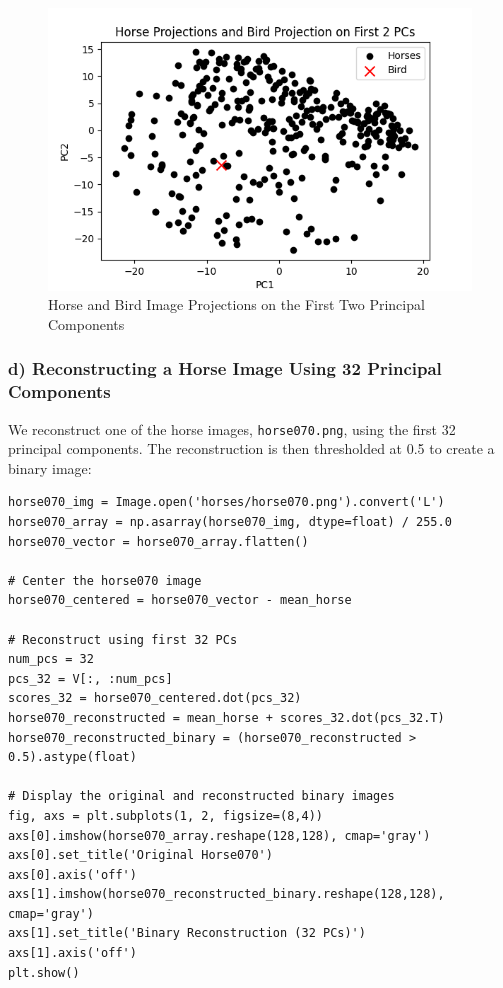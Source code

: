 \documentclass{article}
\begin{document}
\begin{figure}[h]
    \centering
    \includegraphics[width=.6\textwidth]{horse_bird_projection.png}
    \caption{Horse and Bird Image Projections on the First Two Principal Components}
    \label{fig:horse_bird_projection}
\end{figure}
\newpage
\subsubsection*{d) Reconstructing a Horse Image Using 32 Principal Components}

We reconstruct one of the horse images, \texttt{horse070.png}, using the first 32 principal components. The reconstruction is then thresholded at 0.5 to create a binary image:

\begin{verbatim}
horse070_img = Image.open('horses/horse070.png').convert('L')
horse070_array = np.asarray(horse070_img, dtype=float) / 255.0
horse070_vector = horse070_array.flatten()

# Center the horse070 image
horse070_centered = horse070_vector - mean_horse

# Reconstruct using first 32 PCs
num_pcs = 32
pcs_32 = V[:, :num_pcs]
scores_32 = horse070_centered.dot(pcs_32)
horse070_reconstructed = mean_horse + scores_32.dot(pcs_32.T)
horse070_reconstructed_binary = (horse070_reconstructed > 0.5).astype(float)

# Display the original and reconstructed binary images
fig, axs = plt.subplots(1, 2, figsize=(8,4))
axs[0].imshow(horse070_array.reshape(128,128), cmap='gray')
axs[0].set_title('Original Horse070')
axs[0].axis('off')
axs[1].imshow(horse070_reconstructed_binary.reshape(128,128), cmap='gray')
axs[1].set_title('Binary Reconstruction (32 PCs)')
axs[1].axis('off')
plt.show()
\end{verbatim}
\end{document}
